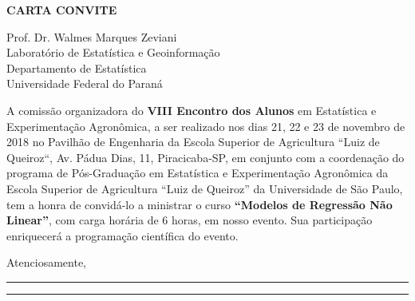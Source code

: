 \documentclass[a4paper, 11pt]{letter}
\title{}
\author{}
\date{}
\begin{document}
\begin{letter}{\bf CARTA CONVITE}

  \opening{
    \noindent
    Prof. Dr. Walmes Marques Zeviani \\[0.1cm]
    Laboratório de Estatística e Geoinformação\\
    Departamento de Estatística \\
    Universidade Federal do Paraná }

  \pagestyle{fancy}
  \thispagestyle{fancy}
  \vspace{0.5cm}

  A comissão organizadora do \textbf{VIII Encontro dos Alunos} em
  Estatística e Experimentação Agronômica, a ser realizado nos dias 21,
  22 e 23 de novembro de 2018 no Pavilhão de Engenharia da Escola
  Superior de Agricultura ``Luiz de Queiroz``, Av. Pádua Dias, 11,
  Piracicaba-SP, em conjunto com a coordenação do programa de
  Pós-Graduação em Estatística e Experimentação Agronômica da Escola
  Superior de Agricultura ``Luiz de Queiroz'' da Universidade de São
  Paulo, tem a honra de convidá-lo a ministrar o curso \textbf{``Modelos
    de Regressão Não Linear''}, com carga horária de 6 horas, em nosso
  evento. Sua participação enriquecerá a programação científica do
  evento.

  \vspace{0.3cm}
  Atenciosamente,
  \vspace{1cm}

  \hfill\begin{minipage}{0.5\linewidth}
    \vspace{2cm}
    \rule{\textwidth}{0.5pt}
  \end{minipage}
  \vfill
  \vspace{-1.5cm}

  \hfill\begin{minipage}{0.5\linewidth}
    \vspace{2cm}
    \rule{\textwidth}{0.5pt}
  \end{minipage}
  \vfill

\end{letter}
\end{document}
